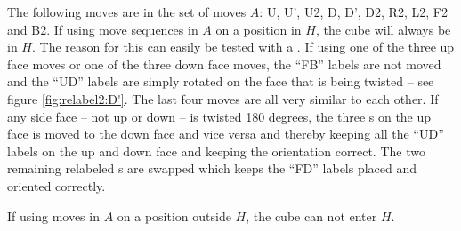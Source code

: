 The following moves are in the set of moves $A$: U, U', U2, D, D', D2, R2, L2, F2 and B2. If using move sequences in $A$ on a position in $H$, the cube will always be in $H$. The reason for this can easily be tested with a \rubik{}. If using one of the three up face moves or one of the three down face moves, the ``FB'' labels are not moved and the ``UD'' labels are simply rotated on the face that is being twisted -- see figure \ref{fig:relabel2:D'}. The last four moves are all very similar to each other. If any side face -- not up or down -- is twisted 180 degrees, the three \facelet{}s on the up face is moved to the down face and vice versa and thereby keeping all the ``UD'' labels on the up and down face and keeping the orientation correct. The two remaining relabeled \facelet{}s are swapped which keeps the ``FD'' labels placed and oriented correctly.

\begin{figure}[htb]
	\centering
	\vspace{0.1\textwidth}
	\caption{}
	\label{fig:relabel2}
\end{figure}

If using moves in $A$ on a position outside $H$, the cube can not enter $H$.

